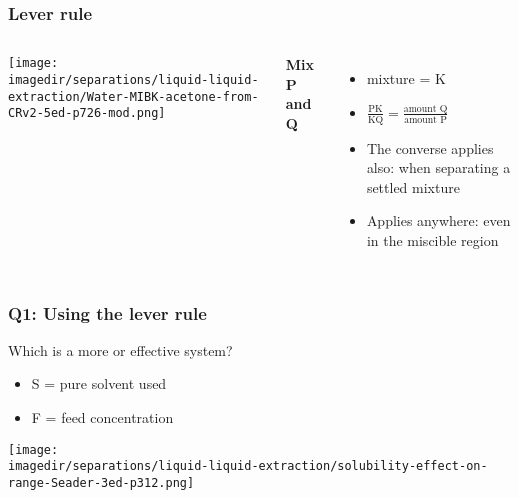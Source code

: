 \begin{frame}\frametitle{Lever rule}
	\begin{columns}[t]
			\begin{center}
				\texttt{[image: \\imagedir/separations/liquid-liquid-extraction/Water-MIBK-acetone-from-CRv2-5ed-p726-mod.png]}
			\end{center}
			\textbf{Mix P and Q}
			
			\begin{itemize}
				\item	mixture = K
				\vspace{12pt}
				\item	$\displaystyle \frac{\text{PK}}{\text{KQ}} = \displaystyle\frac{\text{amount Q}}{\text{amount P}}$
				\vspace{12pt}
				\item	The converse applies also: when separating a settled mixture
				\item	Applies anywhere: even in the miscible region
			\end{itemize}
	\end{columns}
\end{frame}

\begin{frame}\frametitle{Q1: Using the lever rule}
	Which is a more or effective system?
	\begin{itemize}
		\item	S = pure solvent used 
		\item	F = feed concentration
	\end{itemize}
	
	\begin{center}
		\texttt{[image: \\imagedir/separations/liquid-liquid-extraction/solubility-effect-on-range-Seader-3ed-p312.png]}
	\end{center}
	\iftoggle{instructor}{
		Answer: range of feed concentrations ($F$) is widest, i.e. more desirable for (a). Difference between (a) and (b): 
		\begin{itemize}
			\item	due to solvent choice 
			\item	due to different temperatures
			\item	due to pH modification, \emph{etc}
		\end{itemize}
	}{Answer: }
\end{frame}

